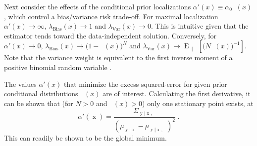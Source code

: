 \documentclass{article}
\DeclareMathOperator{\xrm}{\mathrm{x}}
\DeclareMathOperator{\yrm}{\mathrm{y}}
\DeclareMathOperator{\Erm}{\mathrm{E}}
\DeclareMathOperator{\Xcal}{\mathcal{X}}
\DeclareMathOperator{\Ycal}{\mathcal{Y}}
\DeclareMathOperator{\Bi}{\mathrm{Bi}}
\DeclareMathOperator{\thetam}{\theta_\text{m}}
\DeclareMathOperator{\upthetam}{\uptheta_\text{m}}
\DeclareMathOperator{\thetac}{\theta_\text{c}}
\DeclareMathOperator{\upthetac}{\uptheta_\text{c}}
\DeclareMathOperator{\uppsim}{\uppsi_\text{m}}
\DeclareMathOperator{\alpham}{\alpha_\text{m}}
\DeclareMathOperator{\alphac}{\alpha_\text{c}}
\begin{document}
%

Next consider the effects of the conditional prior localizations $\alpha'(x) \equiv \alpha_0 \alpham(x)$, which control a bias/variance risk trade-off. For maximal localization $\alpha'(x) \to \infty$, $\lambda_{\text{Bias}}(x) \to 1$ and $\lambda_{\text{Var}}(x) \to 0$. This is intuitive given that the estimator tends toward the data-independent solution. Conversely, for $\alpha'(x) \to 0$, $\lambda_{\text{Bias}}(x) \to \big( 1 - \upthetam(x) \big)^N$ and $\lambda_{\text{Var}}(x) \to \Erm_{\uppsim | \upthetam}\left[ \big( N \uppsim(x) \big)^{-1} \right]$. Note that the variance weight is equivalent to the first inverse moment of a positive binomial random variable \cite{stephan}.

The values $\alpha'(x)$ that minimize the excess squared-error for given prior conditional distributions $\alphac(x)$ are of interest. Calculating the first derivative, it can be shown that (for $N > 0$ and $\thetam(x) > 0$) only one stationary point exists, at 
\begin{equation} \label{eq:alpha_x_min_Rex}
\alpha'(\xrm) = \frac{\Sigma_{\yrm | \xrm,\upthetac}}{\left( \mu_{\yrm | \xrm} - \mu_{\yrm | \xrm,\upthetac} \right)^2} \;.
\end{equation}
This can readily be shown to be the global minimum.
\end{document}

